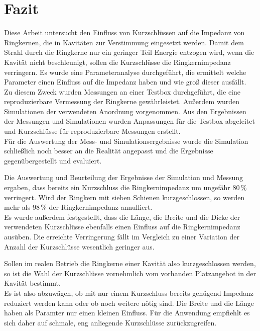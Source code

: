 \section{Fazit}\label{sec:fazit}
Diese Arbeit untersucht den Einfluss von Kurzschlüssen auf die Impedanz von Ringkernen, die in Kavitäten zur Verstimmung eingesetzt werden. Damit dem Strahl durch die Ringkerne nur ein geringer Teil Energie entzogen wird, wenn die Kavität nicht beschleunigt, sollen die Kurzschlüsse die Ringkernimpedanz verringern. Es wurde eine Parameteranalyse durchgeführt, die ermittelt welche Parameter einen Einfluss auf die Impedanz haben und wie groß dieser ausfällt.\\
Zu diesem Zweck wurden Messungen an einer Testbox durchgeführt, die eine reproduzierbare Vermessung der Ringkerne gewährleistet. Außerdem wurden Simulationen der verwendeten Anordnung vorgenommen. Aus den Ergebnissen der Messungen und Simulationen wurden Anpassungen für die Testbox abgeleitet und Kurzschlüsse für reproduzierbare Messungen erstellt.\\
Für die Auswertung der Mess- und Simulationsergebnisse wurde die Simulation schließlich noch besser an die Realität angepasst und die Ergebnisse gegenübergestellt und evaluiert.
\par
Die Auswertung und Beurteilung der Ergebnisse der Simulation und Messung ergaben, dass bereits ein Kurzschluss die Ringkernimpedanz um ungefähr $80\,\%$ verringert. Wird der Ringkern mit sieben Schienen kurzgeschlossen, so werden mehr als $98\,\%$ der Ringkernimpedanz annulliert.\\
Es wurde außerdem festgestellt, dass die Länge, die Breite und die Dicke der verwendeten Kurzschlüsse ebenfalls einen Einfluss auf die Ringkernimpedanz ausüben. Die erreichte Verringerung fällt im Vergleich zu einer Variation der Anzahl der Kurzschlüsse wesentlich geringer aus.
\par
Sollen im realen Betrieb die Ringkerne einer Kavität also kurzgeschlossen werden, so ist die Wahl der Kurzschlüsse vornehmlich vom vorhanden Platzangebot in der Kavität bestimmt.\\
Es ist also abzuwägen, ob mit nur einem Kurzschluss bereits genügend Impedanz reduziert werden kann oder ob noch weitere nötig sind. Die Breite und die Länge haben als Paramter nur einen kleinen Einfluss. Für die Anwendung empfiehlt es sich daher auf schmale, eng anliegende Kurzschlüsse zurückzugreifen. 
\par

